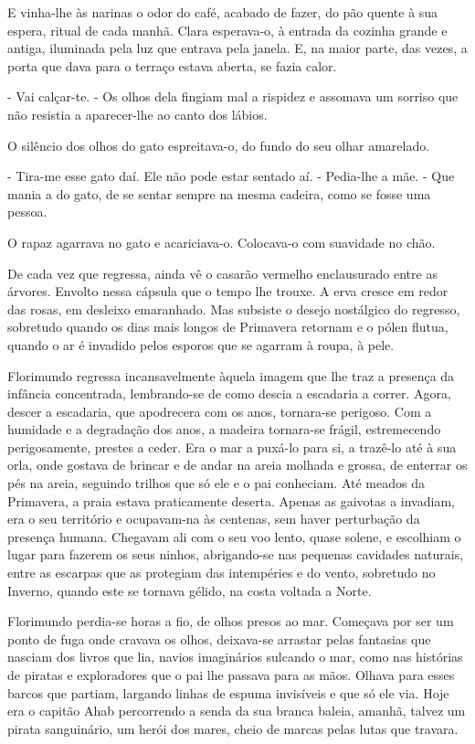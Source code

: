 E vinha-lhe às narinas o odor do café, acabado de fazer, do pão quente à
sua espera, ritual de cada manhã. Clara esperava-o, à entrada da cozinha
grande e antiga, iluminada pela luz que entrava pela janela. E, na maior
parte, das vezes, a porta que dava para o terraço estava aberta, se
fazia calor.

- Vai calçar-te. - Os olhos dela fingiam mal a rispidez e assomava um
sorriso que não resistia a aparecer-lhe ao canto dos lábios.

O silêncio dos olhos do gato espreitava-o, do fundo do seu olhar
amarelado.

- Tira-me esse gato daí. Ele não pode estar sentado aí. - Pedia-lhe a
mãe. - Que mania a do gato, de se sentar sempre na mesma cadeira, como
se fosse uma pessoa.

O rapaz agarrava no gato e acariciava-o. Colocava-o com suavidade no
chão.

De cada vez que regressa, ainda vê o casarão vermelho enclausurado entre
as árvores. Envolto nessa cápsula que o tempo lhe trouxe. A erva cresce
em redor das rosas, em desleixo emaranhado. Mas subsiste o desejo
nostálgico do regresso, sobretudo quando os dias mais longos de
Primavera retornam e o pólen flutua, quando o ar é invadido pelos
esporos que se agarram à roupa, à pele.

Florimundo regressa incansavelmente àquela imagem que lhe traz a
presença da infância concentrada, lembrando-se de como descia a
escadaria a correr. Agora, descer a escadaria, que apodrecera com os
anos, tornara-se perigoso. Com a humidade e a degradação dos anos, a
madeira tornara-se frágil, estremecendo perigosamente, prestes a ceder.
Era o mar a puxá-lo para si, a trazê-lo até à sua orla, onde gostava de
brincar e de andar na areia molhada e grossa, de enterrar os pés na
areia, seguindo trilhos que só ele e o pai conheciam. Até meados da
Primavera, a praia estava praticamente deserta. Apenas as gaivotas a
invadiam, era o seu território e ocupavam-na às centenas, sem haver
perturbação da presença humana. Chegavam ali com o seu voo lento, quase
solene, e escolhiam o lugar para fazerem os seus ninhos, abrigando-se
nas pequenas cavidades naturais, entre as escarpas que as protegiam das
intempéries e do vento, sobretudo no Inverno, quando este se tornava
gélido, na costa voltada a Norte.

Florimundo perdia-se horas a fio, de olhos presos ao mar. Começava por
ser um ponto de fuga onde cravava os olhos, deixava-se arrastar pelas
fantasias que nasciam dos livros que lia, navios imaginários sulcando o
mar, como nas histórias de piratas e exploradores que o pai lhe passava
para as mãos. Olhava para esses barcos que partiam, largando linhas de
espuma invisíveis e que só ele via. Hoje era o capitão Ahab percorrendo
a senda da sua branca baleia, amanhã, talvez um pirata sanguinário, um
herói dos mares, cheio de marcas pelas lutas que travara.

